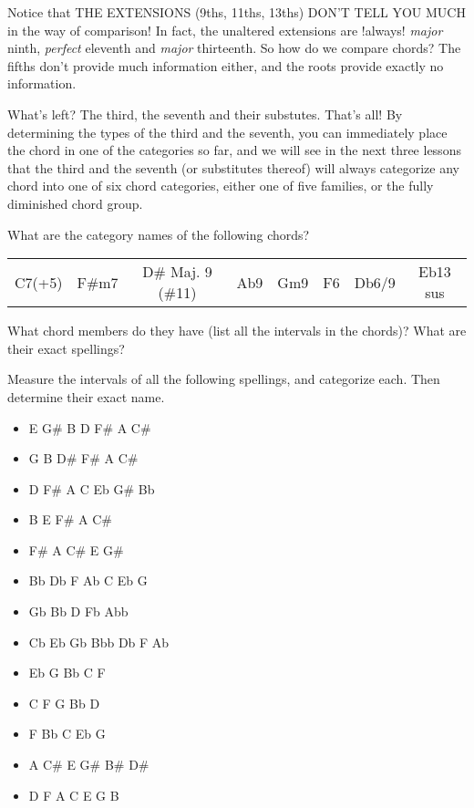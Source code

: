 Notice that THE EXTENSIONS (9ths, 11ths, 13ths) DON'T TELL YOU MUCH in the way
of comparison! In fact, the unaltered extensions are !always! \emph{major} ninth,
\emph{perfect} eleventh and \emph{major} thirteenth. So how do we compare chords? The
fifths don't provide much information either, and the roots provide exactly no
information. 

What's left? The third, the seventh and their substutes. That's all! By
determining the types of the third and the seventh, you can immediately
place the chord in one of the categories so far, and we will see in the
next three lessons that the third and the seventh (or substitutes
thereof) will always categorize any chord into one of six chord
categories, either one of five families, or the fully diminished chord
group.  

What are the category names of the following chords?
\begin{center}
\begin{tabular}{ c c c c c c c c }
C7(+5) & F\#m7 & D\# Maj. 9 (\#11) & Ab9 & Gm9 & F6 & Db6/9 & Eb13 sus\\
\end{tabular}
\end{center}
What chord members do they have (list all the intervals in the chords)?
What are their exact spellings?

Measure the intervals of all the following spellings, and categorize each.
Then determine their exact name.
\begin{multicols}{3}
  \begin{itemize}
    \item E G\# B D F\# A C\#
    \item G B D\# F\# A C\#
    \item D F\# A C Eb G\# Bb
    \item B E F\# A C\#
    \item F\# A C\# E G\#
    \item Bb Db F Ab C Eb G
    \item Gb Bb D Fb Abb
    \item Cb Eb Gb Bbb Db F Ab
    \item Eb G Bb C F
    \item C F G Bb D
    \item F Bb C Eb G
    \item A C\# E G\# B\# D\#
    \item D F A C E G B
  \end{itemize}
\end{multicols}

